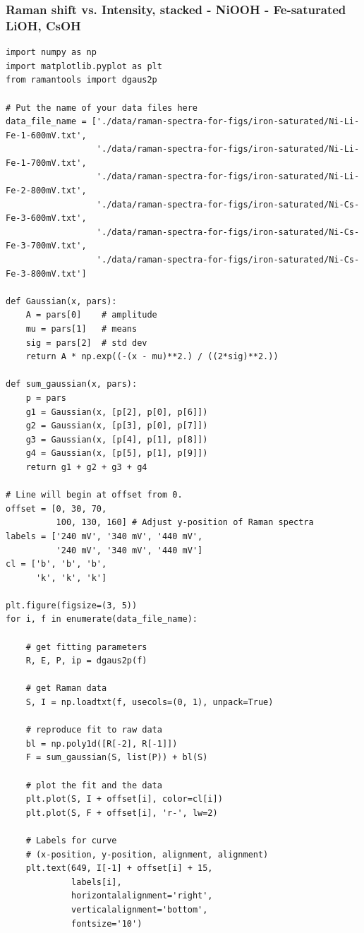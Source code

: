 \documentclass[journal=jpccck,manuscript=suppinfo,email=true]{achemso}
\begin{document}
\subsubsection{Raman shift vs. Intensity, stacked - NiOOH - Fe-saturated LiOH, CsOH}
\label{sec-6-3-2}
\begin{verbatim}
import numpy as np
import matplotlib.pyplot as plt
from ramantools import dgaus2p

# Put the name of your data files here
data_file_name = ['./data/raman-spectra-for-figs/iron-saturated/Ni-Li-Fe-1-600mV.txt',
                  './data/raman-spectra-for-figs/iron-saturated/Ni-Li-Fe-1-700mV.txt',
                  './data/raman-spectra-for-figs/iron-saturated/Ni-Li-Fe-2-800mV.txt',
                  './data/raman-spectra-for-figs/iron-saturated/Ni-Cs-Fe-3-600mV.txt',
                  './data/raman-spectra-for-figs/iron-saturated/Ni-Cs-Fe-3-700mV.txt',
                  './data/raman-spectra-for-figs/iron-saturated/Ni-Cs-Fe-3-800mV.txt']

def Gaussian(x, pars):
    A = pars[0]    # amplitude
    mu = pars[1]   # means
    sig = pars[2]  # std dev
    return A * np.exp((-(x - mu)**2.) / ((2*sig)**2.))

def sum_gaussian(x, pars):
    p = pars
    g1 = Gaussian(x, [p[2], p[0], p[6]])
    g2 = Gaussian(x, [p[3], p[0], p[7]])
    g3 = Gaussian(x, [p[4], p[1], p[8]])
    g4 = Gaussian(x, [p[5], p[1], p[9]])
    return g1 + g2 + g3 + g4

# Line will begin at offset from 0.
offset = [0, 30, 70,
          100, 130, 160] # Adjust y-position of Raman spectra
labels = ['240 mV', '340 mV', '440 mV',
          '240 mV', '340 mV', '440 mV']
cl = ['b', 'b', 'b',
      'k', 'k', 'k']

plt.figure(figsize=(3, 5))
for i, f in enumerate(data_file_name):

    # get fitting parameters
    R, E, P, ip = dgaus2p(f)

    # get Raman data
    S, I = np.loadtxt(f, usecols=(0, 1), unpack=True)

    # reproduce fit to raw data
    bl = np.poly1d([R[-2], R[-1]])
    F = sum_gaussian(S, list(P)) + bl(S)

    # plot the fit and the data
    plt.plot(S, I + offset[i], color=cl[i])
    plt.plot(S, F + offset[i], 'r-', lw=2)

    # Labels for curve
    # (x-position, y-position, alignment, alignment)
    plt.text(649, I[-1] + offset[i] + 15,
             labels[i],
             horizontalalignment='right',
             verticalalignment='bottom',
             fontsize='10')


\end{verbatim}
\end{document}
